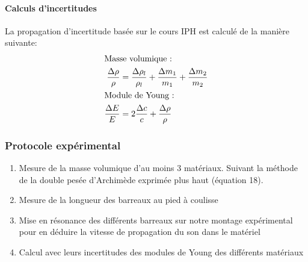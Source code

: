 \paragraph{Calculs d'incertitudes}
La propagation d'incertitude basée sur le cours IPH est calculé de la manière 
suivante:~\cite{gravier-laurent}\\[2ex]
\begin{align}
    \intertext{Masse volumique : }
    \frac{\Delta \rho}{\rho} &= \frac{\Delta \rho_{l}}{\rho_{l}} + \frac{\Delta m_{1}}{m_{1}} + \frac{\Delta m_{2}}{m_{2}}\\
    \intertext{Module de Young : }
    \frac{\Delta E}{E} &= 2 \frac{\Delta c}{c} + \frac{\Delta \rho}{\rho}
\end{align}
\subsubsection{\large Protocole expérimental}
\begin{enumerate}
    \item Mesure de la masse volumique d'au moins 3 matériaux. 
    \subitem Suivant la méthode de la double pesée d'Archimède exprimée plus haut (équation 18). 
    \item Mesure de la longueur des barreaux au pied à coulisse
    \item Mise en résonance des différents barreaux sur notre montage expérimental pour en déduire la 
    vitesse de propagation du son dans le matériel
    \item Calcul avec leurs incertitudes des modules de Young des différents matériaux
\end{enumerate}

